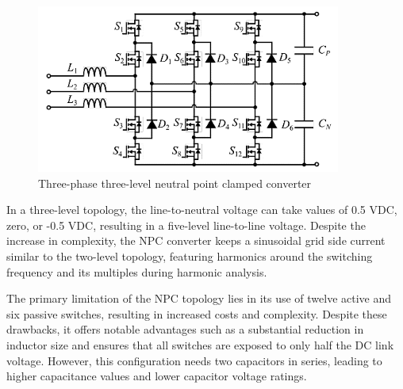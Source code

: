 \documentclass[12pt,a4paper]{book}
\begin{document}
\begin{figure}[h]
  \centering
  \includegraphics[width=10cm]{image6.png}
  \caption{Three-phase three-level neutral point clamped converter}
  \label{fig:image6}
\end{figure}

In a three-level topology, the line-to-neutral voltage can take values of 0.5 VDC, zero, or -0.5 VDC, resulting in a five-level line-to-line voltage. Despite the increase in complexity, the NPC converter keeps a sinusoidal grid side current similar to the two-level topology, featuring harmonics around the switching frequency and its multiples during harmonic analysis.

The primary limitation of the NPC topology lies in its use of twelve active and six passive switches, resulting in increased costs and complexity. Despite these drawbacks, it offers notable advantages such as a substantial reduction in inductor size and ensures that all switches are exposed to only half the DC link voltage. However, this configuration needs two capacitors in series, leading to higher capacitance values and lower capacitor voltage ratings.

\end{document}
